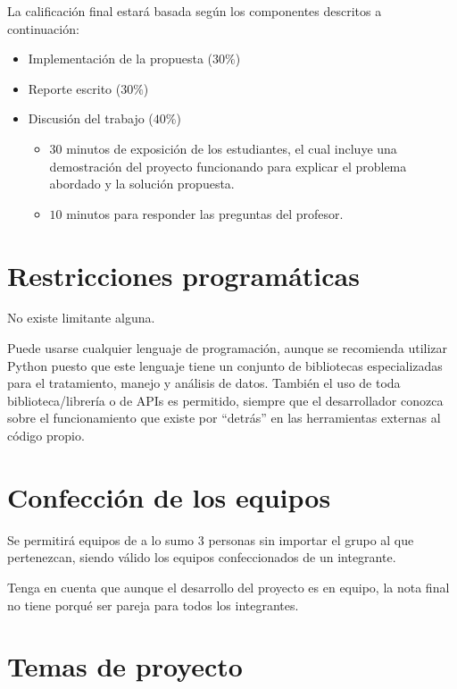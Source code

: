 \documentclass[10pt]{article}
\begin{document}
		La calificación final estará basada según los componentes descritos a continuación:
		\begin{itemize}
			
			\item Implementación de la propuesta ($30\%$)
			
			\item Reporte escrito ($30\%$)
			
			\item Discusión del trabajo ($40\%$)
			\begin{itemize}
				\item $30$ minutos de exposición de los estudiantes, el cual incluye una demostración del proyecto funcionando para explicar el problema abordado y la solución propuesta.
				\item $10$ minutos para responder las preguntas del profesor.
			\end{itemize}
			
		\end{itemize}
		
	
	\section*{Restricciones programáticas}
	
		No existe limitante alguna. 
	
		Puede usarse cualquier lenguaje de programación, aunque se recomienda utilizar Python puesto que este lenguaje tiene un conjunto de bibliotecas especializadas para el tratamiento, manejo y análisis de datos. También el uso de toda biblioteca/librería o de APIs es permitido, siempre que el desarrollador conozca sobre el funcionamiento que existe por ``detrás'' en las herramientas externas al código propio.
	
	
	\section*{Confección de los equipos}
	
		Se permitirá equipos de a lo sumo 3 personas sin importar el grupo al que pertenezcan, siendo válido los equipos confeccionados de un integrante. 
		
		Tenga en cuenta que aunque el desarrollo del proyecto es en equipo, la nota final no tiene porqué ser pareja para todos los integrantes.
	
	
	\section*{Temas de proyecto}
	
\end{document}
